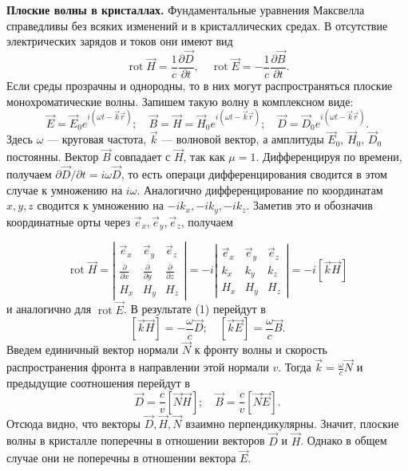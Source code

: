 \documentclass[10pt, a4paper]{article}
\begin{document}
\noindent \textbf{Плоские волны в кристаллах.} Фундаментальные уравнения Максвелла справедливы без всяких изменений и в кристаллических средах. В отсутствие электрических зарядов и токов они имеют вид
\begin{equation}
	\operatorname{rot} \vec{H}=\frac{1}{c} \frac{\partial \vec{D}}{\partial t}, \quad \operatorname{rot} \vec{E}=-\frac{1}{c} \frac{\partial \vec{B}}{\partial t}.
\end{equation}
Если среды прозрачны и однородны, то в них могут распространяться
плоские монохроматические волны. Запишем такую волну в комплексном виде:
\[
\vec{E}=\vec{E}_{0} e^{i(\omega t-\vec{k} \vec{r})} ; \quad \vec{B}=\vec{H}=\vec{H}_{0} e^{i(\omega t-\vec{k} \vec{r})} ; \quad \vec{D}=\vec{D}_{0} e^{i(\omega t-\vec{k} \vec{r})}.
\]
Здесь $\omega$ --- круговая частота, $\vec k$ --- волновой вектор, а амплитуды $\vec E_0$, $\vec H_0$, $\vec D_0$ постоянны. Вектор $\vec B$ совпадает с $\vec H$, так как $\mu = 1$. Дифференцируя по времени, получаем $\partial \vec D / \partial t = i \omega \vec D$, то есть операци дифференцирования сводится в этом случае к умножению на $i \omega$. Аналогично дифференцирование по координатам $x, y, z$ сводится к умножению на $- i k_x, -i k_y, -i k_z$. Заметив это и обозначив координатные орты через $\vec e_x, \vec e_y, \vec e_z$, получаем

\begin{equation*}
\operatorname{rot} \vec{H}=\left|\begin{array}{ccc}
\vec{e}_{x} & \vec{e}_{y} & \vec{e}_{z} \\
\frac{\partial}{\partial x} & \frac{\partial}{\partial y} & \frac{\partial}{\partial z} \\
H_{x} & H_{y} & H_{z}
\end{array}\right|=-i\left|\begin{array}{ccc}
\vec{e}_{x} & \vec{e}_{y} & \vec{e}_{z} \\
k_{x} & k_{y} & k_{z} \\
H_{x} & H_{y} & H_{z}
\end{array}\right|=-i[\vec{k} \vec{H}]
\end{equation*}
 и аналогично для $\operatorname{rot} \vec E $. В результате (1) перейдут в
 \[
 	\left[ \vec k \vec H \right] = - \frac{\omega}{c} \vec D; \quad \left[ \vec k \vec E \right] = \frac{\omega}{c} \vec B.
 \]
 Введем единичный вектор нормали $\vec N$ к фронту волны и скорость распространения фронта в направлении этой нормали $v$. Тогда $\vec k = \frac{\omega}{c} \vec N$ и предыдущие соотношения перейдут в
 \begin{equation}
 	\vec D = \frac{c}{v} \left[ \vec N \vec H \right]; \quad \vec B = \frac{c}{v} \left[ \vec N \vec E \right].
 \end{equation}
 Отсюда видно, что векторы $\vec D, \vec H, \vec N$ взаимно перпендикулярны. Значит, плоские волны в кристалле поперечны в отношении векторов $\vec D$ и $\vec H$. Однако в общем случае они не поперечны в отношении вектора $\vec E$.
 \newpage 
 
\end{document}
